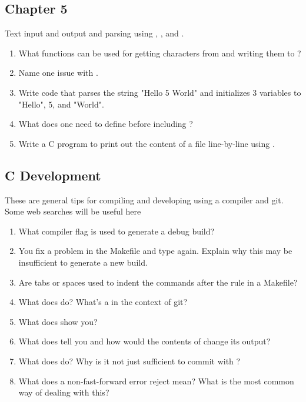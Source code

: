 \subsection{Chapter 5}

Text input and output and parsing using , , and .

\begin{enumerate}
\item What functions can be used for getting characters from  and writing them to ?
\item Name one issue with .
\item Write code that parses the string "Hello 5 World" and initializes 3 variables to "Hello", 5, and "World".
\item What does one need to define before including ?
\item Write a C program to print out the content of a file line-by-line using .
\end{enumerate}

\subsection{C Development}

These are general tips for compiling and developing using a compiler and git.
Some web searches will be useful here

\begin{enumerate}
\item What compiler flag is used to generate a debug build?
\item You fix a problem in the Makefile and type  again.
Explain why this may be insufficient to generate a new build.
\item Are tabs or spaces used to indent the commands after the rule in a Makefile?
\item What does  do? What's a  in the context of git?
\item What does  show you?
\item What does  tell you and how would the contents of  change its output?
\item What does  do? Why is it not just sufficient to commit with ?
\item What does a non-fast-forward error  reject mean? What is the most common way of dealing with this?
\end{enumerate}

